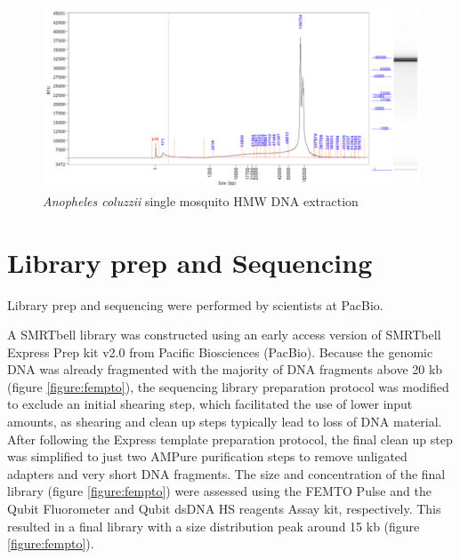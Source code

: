 \begin{figure}[htbp!]
\caption{\textit{Anopheles coluzzii} single mosquito HMW DNA extraction}
\label{figure:fempto2}
\begin{centering}
\includegraphics[width=.85\textwidth]{fempto2.png}
\end{centering}

\end{figure}

\section{Library prep and Sequencing}

Library prep and sequencing were performed by scientists at PacBio. \\

\par{
A SMRTbell library was constructed using an early access version of SMRTbell Express Prep kit v2.0 from Pacific Biosciences (PacBio). Because the genomic DNA was already fragmented with the majority of DNA fragments above 20 kb (figure \ref{figure:fempto}), the sequencing library preparation protocol was modified to exclude an initial shearing step, which facilitated the use of lower input amounts, as shearing and clean up steps typically lead to loss of DNA material. After following the Express template preparation protocol, the final clean up step was simplified to just two AMPure purification steps to remove unligated adapters and very short DNA fragments. The size and concentration of the final library (figure  \ref{figure:fempto}) were assessed using the FEMTO Pulse and the Qubit Fluorometer and Qubit dsDNA HS reagents Assay kit, respectively. This resulted in a final library with a size distribution peak around 15 kb (figure \ref{figure:fempto}). 
}



